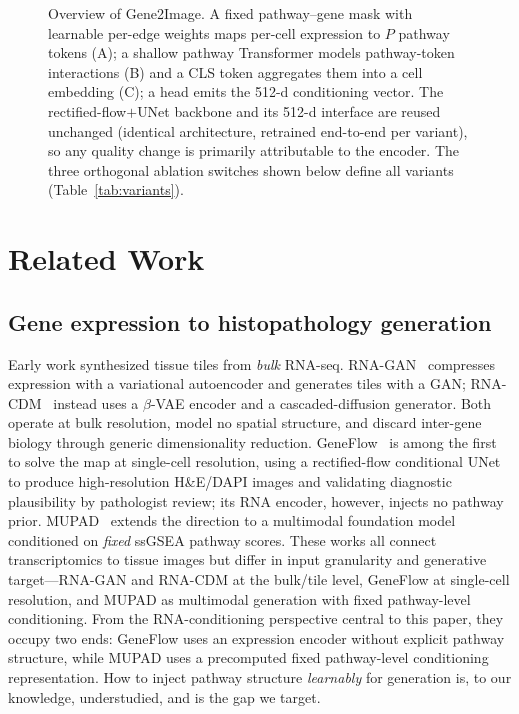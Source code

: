 \documentclass[journal]{IEEEtran}
\newcommand{\method}{Gene2Image}
\begin{document}
\begin{figure}[t]
\begin{tikzpicture}
\end{tikzpicture}
\caption{Overview of \method. A fixed pathway--gene mask with learnable per-edge
weights maps per-cell expression to $P$ pathway tokens (A); a shallow pathway
Transformer models pathway-token interactions (B) and a CLS token aggregates them into a cell
embedding (C); a head emits the 512-d conditioning vector. The
rectified-flow$+$UNet backbone and its 512-d interface are reused unchanged
(identical architecture, retrained end-to-end per variant), so any quality change
is primarily attributable to the encoder. The three
orthogonal ablation switches shown below define all variants
(Table~\ref{tab:variants}).}
\label{fig:overview}
\end{figure}

\section{Related Work}
\label{sec:related}

\subsection{Gene expression to histopathology generation}
Early work synthesized tissue tiles from \emph{bulk} RNA-seq. RNA-GAN~\cite{rnagan}
compresses expression with a variational autoencoder and generates tiles with a
GAN; RNA-CDM~\cite{rnacdm} instead uses a $\beta$-VAE encoder and a
cascaded-diffusion generator. Both operate at bulk resolution, model no spatial structure,
and discard inter-gene biology through generic dimensionality reduction.
GeneFlow~\cite{geneflow} is among the first to solve the map at single-cell resolution,
using a rectified-flow conditional UNet to produce high-resolution H\&E/DAPI
images and validating diagnostic plausibility by pathologist review; its RNA
encoder, however, injects no pathway prior. MUPAD~\cite{mupad} extends the
direction to a multimodal foundation model conditioned on \emph{fixed} ssGSEA
pathway scores. These works all connect transcriptomics to tissue images but differ
in input granularity and generative target---RNA-GAN and RNA-CDM at the bulk/tile
level, GeneFlow at single-cell resolution, and MUPAD as multimodal generation with
fixed pathway-level conditioning. From the RNA-conditioning perspective central to
this paper, they occupy two ends: GeneFlow uses an expression encoder without
explicit pathway structure, while MUPAD uses a precomputed fixed pathway-level
conditioning representation. How to inject pathway structure \emph{learnably} for
generation is, to our knowledge, understudied, and is the gap we target.
\end{document}
